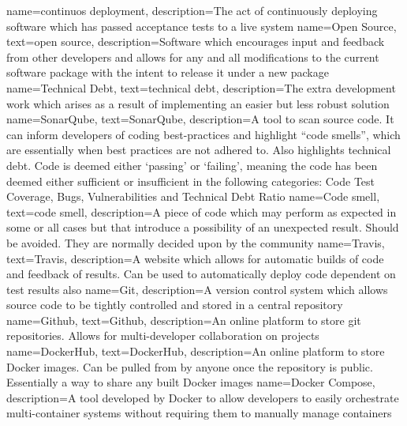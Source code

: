 {
		name={continuos deployment},
		description={The act of continuously deploying software which has passed acceptance tests to a live system}
}
{
    name={Open Source},
    text={open source},
    description={Software which encourages input and feedback from other developers and allows for any and all modifications to the current software package with the intent to release it under a new package}
}
{
    name={Technical Debt},
    text={technical debt},
    description={The extra development work which arises as a result of implementing an easier but less robust solution}
}
{
    name={SonarQube},
    text={SonarQube},
    description={A tool to scan source code. It can inform developers of coding best-practices and highlight ``code smells'', which are essentially when best practices are not adhered to. Also highlights technical debt. Code is deemed either `passing' or `failing', meaning the code has been deemed either sufficient or insufficient in the following categories: Code Test Coverage, Bugs, Vulnerabilities and Technical Debt Ratio}
}
{
    name={Code smell},
    text={code smell},
    description={A piece of code which may perform as expected in some or all cases but that introduce a possibility of an unexpected result. Should be avoided. They are normally decided upon by the community}
}
{
    name={Travis},
    text={Travis},
    description={A website which allows for automatic builds of code and feedback of results. Can be used to automatically deploy code dependent on test results also}
}
{
    name={Git},
    description={A version control system which allows source code to be tightly controlled and stored in a central repository}
}
{
    name={Github},
    text={Github},
    description={An online platform to store git repositories. Allows for multi-developer collaboration on projects}
}
{
    name={DockerHub},
    text={DockerHub},
    description={An online platform to store Docker images. Can be pulled from by anyone once the repository is public. Essentially a way to share any built Docker images}
}
{
    name={Docker Compose},
    description={A tool developed by Docker to allow developers to easily orchestrate multi-container systems without requiring them to manually manage containers}
}
